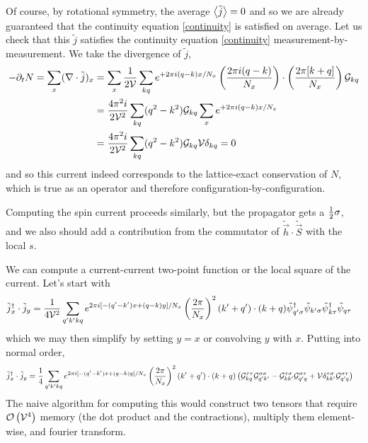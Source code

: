Of course, by rotational symmetry, the average $\left\langle \tilde{j} \right\rangle=0$ and so we are already guaranteed that the continuity equation \eqref{continuity} is satisfied on average.
Let us check that this $\tilde{j}$ satisfies the continuity equation \eqref{continuity} measurement-by-measurement.
We take the divergence of $\tilde{j}$,
\begin{align}
	-\partial_t N = \sum_x (\nabla\cdot \tilde{j})_x
	&=
	\sum_x \frac{1}{2\mathcal{V}} \sum_{kq} e^{+2\pi i (q-k) x / N_x} \left(\frac{2\pi i(q-k)}{N_x}\right) \cdot \left(\frac{2\pi [ k+q ]}{N_x}\right)
		\mathcal{G}_{kq}
	\nonumber\\
	&=
	\frac{4\pi^2i}{2\mathcal{V}^2} \sum_{kq}  (q^2-k^2)
		\mathcal{G}_{kq} \sum_x e^{+2\pi i (q-k) x / N_x}
	\nonumber\\
	&=
	\frac{4\pi^2i}{2\mathcal{V}^2} \sum_{kq}  (q^2-k^2)
		\mathcal{G}_{kq} \mathcal{V} \delta_{kq} = 0
\end{align}
and so this current indeed corresponds to the lattice-exact conservation of $N$, which is true as an operator and therefore configuration-by-configuration.

Computing the spin current proceeds similarly, but the propagator gets a $\frac{1}{2} \sigma$, and we also should add a contribution from the commutator of $\tilde{\vec{h}}\cdot\tilde{\vec{S}}$ with the local $s$.

We can compute a current-current two-point function or the local square of the current.
Let's start with
\begin{align}
	\tilde{j}{}^{\dagger}_x \cdot \tilde{j}_y
	&=
	\frac{1}{4\mathcal{V}^2}\sum_{q'k'kq} e^{2\pi i[ -(q'-k')x + (q-k) y]/N_x} \left(\frac{2\pi}{N_x}\right)^2 (k'+q')\cdot(k+q)
	\tilde{\psi}{}^{\dagger}_{q'\sigma} \tilde{\psi}_{k'\sigma} \tilde{\psi}{}^{\dagger}_{k\tau} \tilde{\psi}_{q\tau}
\end{align}
which we may then simplify by setting $y=x$ or convolving $y$ with $x$.
Putting into normal order,
\begin{align}
	\tilde{j}{}^{\dagger}_x \cdot \tilde{j}_y
	&=
	\frac{1}{4}\sum_{q'k'kq} e^{2\pi i[ -(q'-k')x + (q-k) y]/N_x} \left(\frac{2\pi}{N_x}\right)^2 (k'+q')\cdot(k+q)
	\left(\mathcal{G}^{\tau\tau}_{kq}\mathcal{G}^{\sigma\sigma}_{q'k'} - \mathcal{G}^{\tau\sigma}_{kk'} \mathcal{G}^{\sigma\tau}_{q'q} + \mathcal{V} \delta^{\tau\sigma}_{kk'} \mathcal{G}^{\sigma\tau}_{q'q}\right)
\end{align}
The naive algorithm for computing this would construct two tensors that require $\mathcal{O}\left(\mathcal{V}^4\right)$ memory (the dot product and the contractions), multiply them element-wise, and fourier transform.

